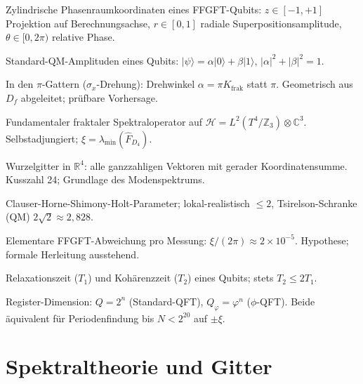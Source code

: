 \begin{description}[leftmargin=4.5em,style=sameline,itemsep=0.4em]
  \item[$(z,r,\theta)$] Zylindrische Phasenraumkoordinaten eines
    FFGFT-Qubits: $z\in[-1,+1]$ Projektion auf Berechnungsachse,
    $r\in[0,1]$ radiale Superpositionsamplitude, $\theta\in[0,2\pi)$
    relative Phase.
  \item[$(\alpha,\beta)$] Standard-QM-Amplituden eines Qubits:
    $|\psi\rangle = \alpha|0\rangle+\beta|1\rangle$,
    $|\alpha|^2+|\beta|^2 = 1$.
  \item[$K_{\mathrm{frak}}$ (Gatter)] In den $\pi$-Gattern
    ($\sigma_x$-Drehung): Drehwinkel $\alpha = \pi K_{\mathrm{frak}}$
    statt $\pi$. Geometrisch aus $D_f$ abgeleitet; prüfbare Vorhersage.
  \item[$\hat F$] Fundamentaler fraktaler Spektraloperator auf
    $\mathcal{H} = L^2(T^4/\mathbb{Z}_3)\otimes\mathbb{C}^3$.
    Selbstadjungiert; $\xi = \lambda_{\min}(\hat F_{D_4})$.
  \item[$D_4$] Wurzelgitter in $\mathbb{R}^4$: alle ganzzahligen
    Vektoren mit gerader Koordinatensumme. Kusszahl 24; Grundlage des
    Modenspektrums.
  \item[$\mathrm{CHSH}$] Clauser-Horne-Shimony-Holt-Parameter;
    lokal-realistisch $\le2$, Tsirelson-Schranke (QM)
    $2\sqrt2\approx2{,}828$.
  \item[$\Delta\mathrm{CHSH}_{\mathrm{elem}}$] Elementare
    FFGFT-Abweichung pro Messung: $\xi/(2\pi)\approx2\times10^{-5}$.
    Hypothese; formale Herleitung ausstehend.
  \item[$T_1,\,T_2$] Relaxationszeit ($T_1$) und Kohärenzzeit ($T_2$)
    eines Qubits; stets $T_2\le2T_1$.
  \item[$Q,\,Q_\varphi$] Register-Dimension: $Q = 2^n$ (Standard-QFT),
    $Q_\varphi = \varphi^n$ ($\phi$-QFT). Beide äquivalent für
    Periodenfindung bis $N < 2^{20}$ auf $\pm\xi$.
\end{description}

\section*{Spektraltheorie und Gitter}

